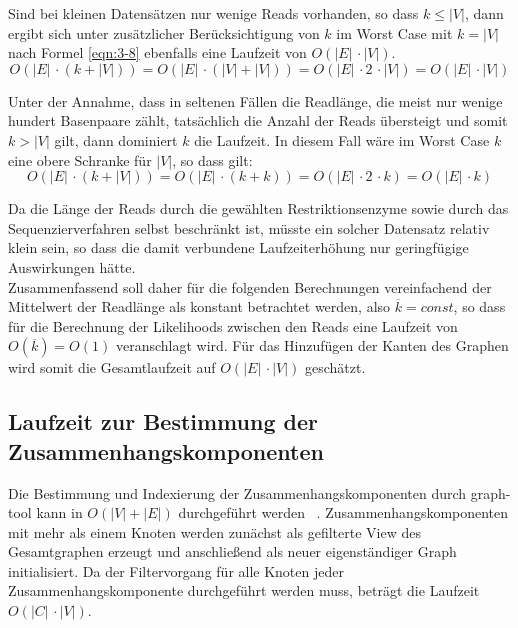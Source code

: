 Sind bei kleinen Datensätzen nur wenige Reads vorhanden, so dass $ k \leq |V| $, dann ergibt sich unter zusätzlicher Berücksichtigung von $k$ im Worst Case mit $ k = |V| $ nach Formel \eqref{eqn:3-8} ebenfalls eine Laufzeit von $O(|E|\, \cdotp |V|) $.
\begin{equation} \label{eqn:3-8}
\tag{3-8}
O(|E|\, \cdotp (k + |V|)) = O(|E|\, \cdotp (|V| + |V|)) = O(|E|\, \cdotp 2 \, \cdotp |V|) = O(|E|\, \cdotp |V|)
\end{equation}

Unter der Annahme, dass in seltenen Fällen die Readlänge, die meist nur wenige hundert Basenpaare zählt, tatsächlich die Anzahl der Reads übersteigt und somit $ k > |V| $ gilt, dann dominiert $k$ die Laufzeit. In diesem Fall wäre im Worst Case $k$ eine obere Schranke für $|V|$, so dass gilt:
\begin{equation} \label{eqn:3-9}
\tag{3-9}
O(|E|\, \cdotp (k + |V|)) = O(|E|\, \cdotp (k + k)) = O(|E|\, \cdotp 2 \, \cdotp k) = O(|E|\, \cdotp k)
\end{equation}

Da die Länge der Reads durch die gewählten Restriktionsenzyme sowie durch das Sequenzierverfahren selbst beschränkt ist, müsste ein solcher Datensatz relativ klein sein, so dass die damit verbundene Laufzeiterhöhung nur geringfügige Auswirkungen hätte. \\

Zusammenfassend soll daher für die folgenden Berechnungen vereinfachend der Mittelwert der Readlänge als konstant betrachtet werden, also $\overline{k}=const$, so dass für die Berechnung der Likelihoods zwischen den Reads eine Laufzeit von $O(\overline{k}) = O(1)$ veranschlagt wird. Für das Hinzufügen der Kanten des Graphen wird somit die Gesamtlaufzeit auf $ O(|E|\, \cdotp |V|) $ geschätzt.\\

\subsection{Laufzeit zur Bestimmung der Zusammenhangskomponenten} \label{subsec:}

Die Bestimmung und Indexierung der Zusammenhangskomponenten durch graph-tool kann in $ O(|V| + |E|) $ durchgeführt werden ~\cite{docs_graph_tool}. Zusammenhangskomponenten mit mehr als einem Knoten werden zunächst als gefilterte View des Gesamtgraphen erzeugt und anschließend als neuer eigenständiger Graph initialisiert. Da der Filtervorgang für alle Knoten jeder Zusammenhangskomponente durchgeführt werden muss, beträgt die Laufzeit $ O(|C| \, \cdotp |V|) $. 

